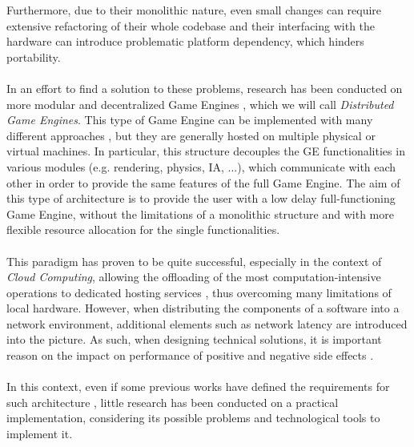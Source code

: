Furthermore, due to their monolithic nature, even small changes can require extensive refactoring of their whole codebase and their interfacing with the hardware can introduce problematic platform dependency, which hinders portability. \\ \\
In an effort to find a solution to these problems, research has been conducted on more modular and decentralized Game Engines \cite{womak:distributed-architecture-interactive-multiplayer, womak:distributed-cloud-gaming-pipeline, womak:distributed-game-engine-android}, which we will call \textit{Distributed Game Engines}. This type of Game Engine can be implemented with many different approaches \cite{womak:revamping-cloud-games, womak:distributed-cloud-gaming-pipeline, womak:distributed-game-engine-android}, but they are generally hosted on multiple physical or virtual machines. In particular, this structure decouples the GE functionalities in various modules (e.g. rendering, physics, IA, ...), which communicate with each other in order to provide the same features of the full Game Engine. The aim of this type of architecture is to provide the user with a low delay full-functioning Game Engine, without the limitations of a monolithic structure and with more flexible resource allocation for the single functionalities. \\ \\
This paradigm has proven to be quite successful, especially in the context of \textit{Cloud Computing}, allowing the offloading of the most computation-intensive operations to dedicated hosting services \cite{womak:revamping-cloud-games, womak:distributed-cloud-gaming-pipeline}, thus overcoming many limitations of local hardware. However, when distributing the components of a software into a network environment, additional elements such as network latency are introduced into the picture. As such, when designing technical solutions, it is important reason on the impact on performance of positive and negative side effects \cite{womak:performance-analysis-game-engine}. \\ \\
In this context, even if some previous works have defined the requirements for such architecture \cite{womak:revamping-cloud-games, womak:game-engines-serious-game}, little research has been conducted on a practical implementation, considering its possible problems and technological tools to implement it.

